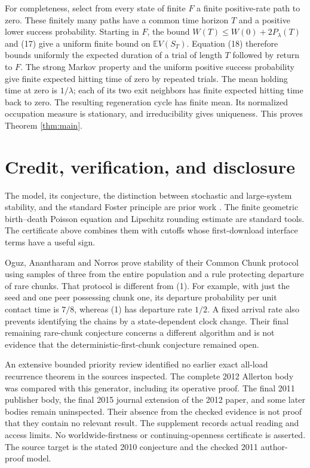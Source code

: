 \documentclass[11pt]{article}
\newcommand{\E}{\mathbb E}
\begin{document}
For completeness, select from every state of finite $F$ a finite
positive-rate path to zero. These finitely many paths have a common
time horizon $T$ and a positive lower success probability.
Starting in $F$, the bound
$W(T)\le W(0)+2P_\lambda(T)$ and (17) give a uniform finite bound on
$\E V(S_T)$. Equation (18) therefore bounds uniformly the expected
duration of a trial of length $T$ followed by return to $F$.
The strong Markov property and the uniform positive success probability
give finite expected hitting time of zero by repeated trials.
The mean holding time at zero is $1/\lambda$; each of its two exit
neighbors has finite expected hitting time back to zero.
The resulting regeneration cycle has finite mean. Its normalized
occupation measure is stationary, and irreducibility gives uniqueness.
This proves Theorem \ref{thm:main}.

\section{Credit, verification, and disclosure}

The model, its conjecture, the distinction between stochastic and
large-system stability, and the standard Foster principle are prior
work \cite{OWR,NRE09,NRE11,MT}. The finite geometric birth--death
Poisson equation and Lipschitz rounding estimate are standard tools.
The certificate above combines them with cutoffs whose first-download
interface terms have a useful sign.

Oguz, Anantharam and Norros \cite{OAN12} prove stability of their
Common Chunk protocol using samples of three from the entire
population and a rule protecting departure of rare chunks.
That protocol is different from (1). For example, with just the seed
and one peer possessing chunk one, its departure probability per
unit contact time is $7/8$, whereas (1) has departure rate $1/2$.
A fixed arrival rate also prevents identifying the chains by a
state-dependent clock change. Their final remaining rare-chunk
conjecture concerns a different algorithm and is not evidence that
the deterministic-first-chunk conjecture remained open.

An extensive bounded priority review identified no earlier exact all-load
recurrence theorem in the sources inspected. The complete 2012 Allerton
body was compared with this generator, including its operative proof.
The final 2011 publisher body, the final 2015 journal extension of the
2012 paper, and some later bodies remain uninspected. Their absence
from the checked evidence is not proof that they contain no relevant
result. The supplement records actual reading and access limits. No
worldwide-firstness or continuing-openness certificate is asserted.
The source target is the stated 2010 conjecture and the checked 2011
author-proof model.
\end{document}
